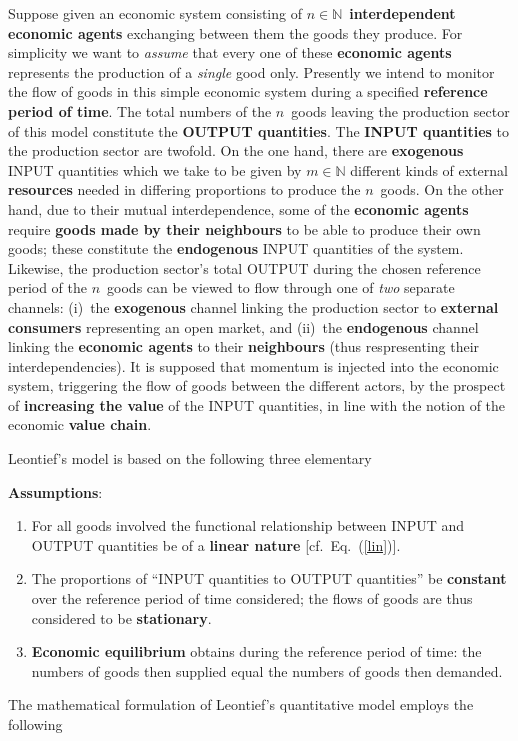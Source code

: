 \medskip
\noindent
Suppose given an economic system consisting of $n \in 
\mathbb{N}$~{\bf interdependent economic agents} exchanging 
between them the goods they produce. For simplicity we want to 
\emph{assume} that every one of these {\bf economic agents} 
represents the production of a \emph{single} good only. Presently 
we intend to monitor the flow of goods in this simple economic 
system during a specified {\bf reference period of time}. The 
total numbers of the $n$~goods leaving the production sector of 
this model constitute the {\bf OUTPUT quantities}. The {\bf INPUT 
quantities} to the production sector are twofold. On the one hand, 
there are {\bf exogenous} INPUT quantities which we take to be 
given by $m \in \mathbb{N}$ different kinds of external {\bf 
resources} needed in differing proportions to produce the 
$n$~goods. On the other hand, due to their mutual interdependence, 
some of the {\bf economic agents} require {\bf goods made by their 
neighbours} to be able to produce their own goods; these 
constitute the {\bf endogenous} INPUT quantities of the system. 
Likewise, the production sector's total OUTPUT during the chosen 
reference period of the $n$~goods can be viewed to flow through 
one of \emph{two} separate channels: (i)~the {\bf exogenous} 
channel linking the production sector to {\bf external consumers} 
representing an open market, and (ii)~the {\bf endogenous} channel 
linking the {\bf economic agents} to their {\bf neighbours} (thus 
respresenting their interdependencies). It is supposed that 
momentum is injected into the economic system, triggering the flow 
of goods between the different actors, by the prospect of {\bf 
increasing the value} of the INPUT quantities, in line with the 
notion of the economic {\bf value chain}.

\medskip
\noindent
Leontief's model is based on the following three elementary

\medskip
\noindent
{\bf Assumptions}:
%
\begin{enumerate}
\item For all goods involved the functional relationship between 
INPUT and OUTPUT quantities be of a {\bf linear nature} [cf.\ 
Eq.~(\ref{lin})].

\item The proportions of ``INPUT quantities to OUTPUT quantities'' be {\bf constant} over the reference period of time considered; the flows of goods are thus considered to be {\bf stationary}.

\item {\bf Economic equilibrium} obtains during the reference period of time: the numbers of goods then supplied equal the numbers of goods then demanded.
\end{enumerate}
%
The mathematical formulation of Leontief's quantitative
model employs the following

